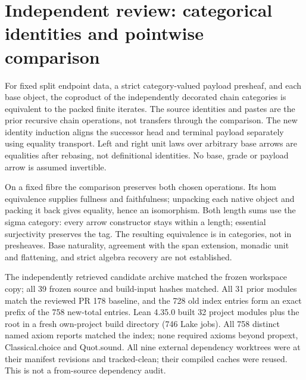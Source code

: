 \documentclass{article}
\begin{document}
\section*{Independent review: categorical identities and pointwise comparison}
For fixed split endpoint data, a strict category-valued payload presheaf, and each base object, the coproduct of the independently decorated chain categories is equivalent to the packed finite iterates. The source identities and pastes are the prior recursive chain operations, not transfers through the comparison. The new identity induction aligns the successor head and terminal payload separately using equality transport. Left and right unit laws over arbitrary base arrows are equalities after rebasing, not definitional identities. No base, grade or payload arrow is assumed invertible.
\par On a fixed fibre the comparison preserves both chosen operations. Its hom equivalence supplies fullness and faithfulness; unpacking each native object and packing it back gives equality, hence an isomorphism. Both length sums use the sigma category: every arrow constructor stays within a length; essential surjectivity preserves the tag. The resulting equivalence is in categories, not in presheaves. Base naturality, agreement with the span extension, monadic unit and flattening, and strict algebra recovery are not established.
\par The independently retrieved candidate archive matched the frozen workspace copy; all 39 frozen source and build-input hashes matched. All 31 prior modules match the reviewed PR 178 baseline, and the 728 old index entries form an exact prefix of the 758 new-total entries. Lean 4.35.0 built 32 project modules plus the root in a fresh own-project build directory (746 Lake jobs). All 758 distinct named axiom reports matched the index; none required axioms beyond propext, Classical.choice and Quot.sound. All nine external dependency worktrees were at their manifest revisions and tracked-clean; their compiled caches were reused. This is not a from-source dependency audit.
\end{document}
